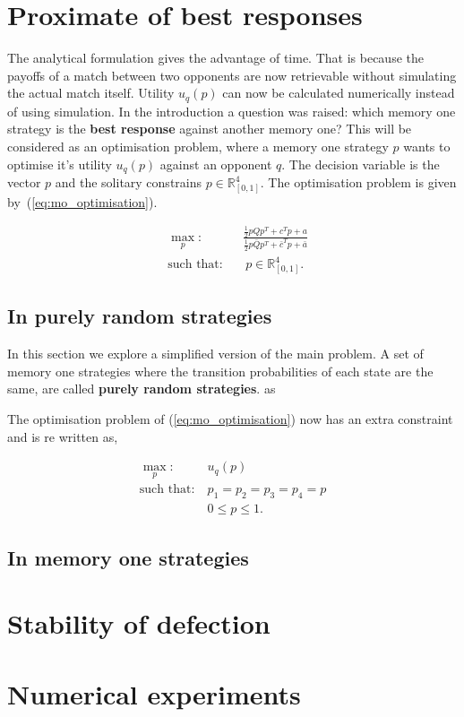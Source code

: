 \documentclass[10pt]{article}
\newcommand{\R}{\mathbb{R}}
\begin{document}
\section{Proximate of best responses}

The analytical formulation gives the advantage of time. That is because the 
payoffs of a match between two opponents are now retrievable without 
simulating the actual match itself. Utility \(u_q(p)\) can 
now be calculated numerically instead of using simulation. In the introduction 
a question was raised: which memory one strategy is the \textbf{best response}
against another memory one? This will be considered as an optimisation problem,
where a memory one strategy \(p\) wants to optimise it's utility \(u_q(p)\)
against an opponent \(q\). The decision variable is the vector \(p\) and the 
solitary constrains \(p \in \R^4_{[0, 1]} \). The optimisation problem is 
given by~(\ref{eq:mo_optimisation}).

\begin{equation}\label{eq:mo_optimisation}
\begin{aligned}
& \max_p: && \frac{\frac{1}{2}  p  Q  p^T + c^T p + a} 
                  {\frac{1}{2}  p  \bar{Q}  p^T + \bar{c}^T  p + \bar{a}}
\\
& \text{such that}: && \ p \in \R^4_{[0, 1]}.
\end{aligned}
\end{equation}

\subsection{In purely random strategies}

In this section we explore a simplified version of the main problem. A set of 
memory one strategies where the transition probabilities of each state are the 
same, are called \textbf{purely random strategies}. 
as

The optimisation problem of (\ref{eq:mo_optimisation}) now has an extra constraint
and is re written as,

\begin{equation}\label{eq:random_optimisation}
\begin{aligned}
\max_p: & \ u_q(p)
\\
\text{such that}: & \ p_1 = p_2 = p_3 = p_4 = p\\
    & \ 0 \leq p \leq 1. 
\end{aligned}
\end{equation}


\subsection{In memory one strategies}

\section{Stability of defection}

\section{Numerical experiments}



\end{document}
